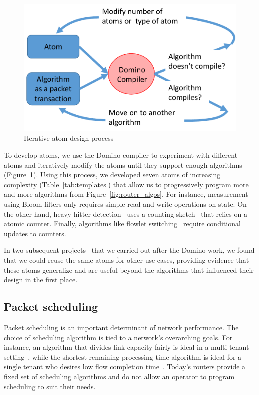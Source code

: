 \begin{figure}
\includegraphics[width=\columnwidth]{iterative_design_process.pdf}
\caption{Iterative atom design process}
\label{fig:iterative_design}
\end{figure}

To develop atoms, we use the Domino compiler to experiment with different atoms
and iteratively modify the atoms until they support enough algorithms
(Figure~\ref{fig:iterative_design}).  Using this process, we developed seven
atoms of increasing complexity (Table~\ref{tab:templates}) that allow us to
progressively program more and more algorithms from
Figure~\ref{fig:router_algos}. For instance, measurement using Bloom filters
only requires simple read and write operations on state. On the other hand,
heavy-hitter detection~\cite{opensketch} uses a counting
sketch~\cite{count_min} that relies on a atomic counter. Finally, algorithms
like flowlet switching~\cite{flare} require conditional updates to counters.

In two subsequent projects~\cite{hula, perf_query} that we carried out after
the Domino work, we found that we could reuse the same atoms for other use
cases, providing evidence that these atoms generalize and are useful beyond the
algorithms that influenced their design in the first place.

\subsection{Packet scheduling}

Packet scheduling is an important determinant of network performance. The
choice of scheduling algorithm is tied to a network's overarching goals. For
instance, an algorithm that divides link capacity fairly is ideal in a
multi-tenant setting~\cite{wfq}, while the shortest remaining processing time
algorithm is ideal for a single tenant who desires low flow completion
time~\cite{pFabric}. Today's routers provide a fixed set of scheduling
algorithms and do not allow an operator to program scheduling to suit their
needs.

